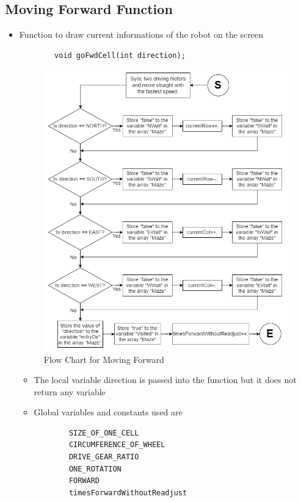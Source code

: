\documentclass[11pt]{article}
\begin{document}

\subsection{Moving Forward Function}
\begin{itemize}
\item Function to draw current informations of the robot on the screen
	\begin{verbatim}
		void goFwdCell(int direction);
	\end{verbatim}
\begin{figure}[htp]
\centering
\includegraphics[scale=0.56]{images/Software_Flowchart/Moving_Forward.png}
\caption{Flow Chart for Moving Forward}
\label{}
\end{figure}	
	\begin{itemize}
	\item The local variable direction is passed into the function but it does not return any variable
	\item Global variables and constants used are
	\begin{verbatim}
		SIZE_OF_ONE_CELL
		CIRCUMFERENCE_OF_WHEEL
		DRIVE_GEAR_RATIO
		ONE_ROTATION
		FORWARD
		timesForwardWithoutReadjust
	\end{verbatim}
	\end{itemize}
\end{itemize}
\newpage
\end{document}
